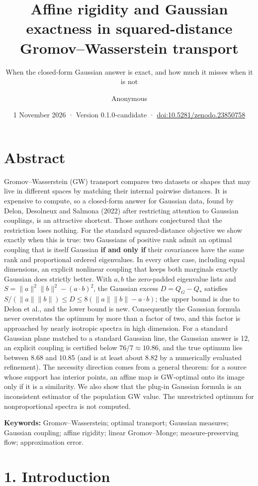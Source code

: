 \documentclass[
  british,
  11pt,
  a4paper,
]{article}
\title{Affine rigidity and Gaussian exactness in squared-distance
Gromov--Wasserstein transport}
\subtitle{When the closed-form Gaussian answer is exact, and how much it
misses when it is not}
\author{Anonymous}
\date{1 November 2026 · Version 0.1.0-candidate ·
\href{https://doi.org/10.5281/zenodo.23850758}{doi:10.5281/zenodo.23850758}}
\begin{document}
\maketitle

\section{Abstract}\label{abstract}

Gromov--Wasserstein (GW) transport compares two datasets or shapes that
may live in different spaces by matching their internal pairwise
distances. It is expensive to compute, so a closed-form answer for
Gaussian data, found by Delon, Desolneux and Salmona (2022) after
restricting attention to Gaussian couplings, is an attractive shortcut.
Those authors conjectured that the restriction loses nothing. For the
standard squared-distance objective we show exactly when this is true:
two Gaussians of positive rank admit an optimal coupling that is itself
Gaussian \textbf{if and only if} their covariances have the same rank
and proportional ordered eigenvalues. In every other case, including
equal dimensions, an explicit nonlinear coupling that keeps both
marginals exactly Gaussian does strictly better. With \(a,b\) the
zero-padded eigenvalue lists and \(S=\|a\|^2\|b\|^2-(a\cdot b)^2\), the
Gaussian excess \(D=Q_G-Q_*\) satisfies
\(S/(\|a\|\|b\|)\le D\le8(\|a\|\|b\|-a\cdot b)\); the upper bound is due
to Delon et al., and the lower bound is new. Consequently the Gaussian
formula never overstates the optimum by more than a factor of two, and
this factor is approached by nearly isotropic spectra in high dimension.
For a standard Gaussian plane matched to a standard Gaussian line, the
Gaussian answer is 12, an explicit coupling is certified below
\(76/7\approx10.86\), and the true optimum lies between 8.68 and 10.85
(and is at least about 8.82 by a numerically evaluated refinement). The
necessity direction comes from a general theorem: for a source whose
support has interior points, an affine map is GW-optimal onto its image
only if it is a similarity. We also show that the plug-in Gaussian
formula is an inconsistent estimator of the population GW value. The
unrestricted optimum for nonproportional spectra is not computed.

\textbf{Keywords:} Gromov--Wasserstein; optimal transport; Gaussian
measures; Gaussian coupling; affine rigidity; linear Gromov--Monge;
measure-preserving flow; approximation error.

\section{1. Introduction}\label{introduction}
\end{document}

